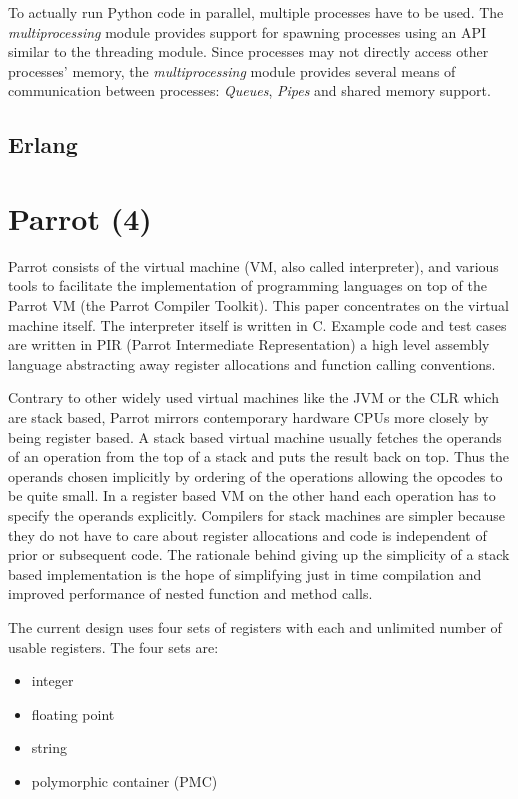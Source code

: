 \documentclass[bachelor,english]{hgbthesis}
\begin{document}
To actually run Python code in parallel, multiple processes have to be used. The \textit{multiprocessing} module provides support for spawning processes using an API similar to the threading module\cite{PythonMultiProcessingManual}. Since processes may not directly access other processes' memory, the \textit{multiprocessing} module provides several means of communication between processes: \textit{Queues}, \textit{Pipes} and shared memory support.

\section{Erlang}

\chapter{Parrot (4)}

Parrot consists of the virtual machine (VM, also called interpreter), and various tools to facilitate the implementation of programming languages on top of the Parrot VM (the Parrot Compiler Toolkit). This paper concentrates on the virtual machine itself. The interpreter itself is written in C. Example code and test cases are written in PIR (Parrot Intermediate Representation) a high level assembly language abstracting away register allocations and function calling conventions.

Contrary to other widely used virtual machines like the JVM or the CLR which are stack based, Parrot mirrors contemporary hardware CPUs more closely by being register based. A stack based virtual machine usually fetches the operands of an operation from the top of a stack and puts the result back on top. Thus the operands chosen implicitly by ordering of the operations allowing the opcodes to be quite small. In a register based VM on the other hand each operation has to specify the operands explicitly. Compilers for stack machines are simpler because they do not have to care about register allocations and code is independent of prior or subsequent code\cite{VMShowdown}. The rationale behind giving up the simplicity of a stack based implementation is the hope of simplifying just in time compilation and improved performance of nested function and method calls.

The current design uses four sets of registers with each and unlimited number of usable registers. The four sets are:
%
\begin{itemize}
\item integer
\item floating point
\item string
\item polymorphic container (PMC)
\end{itemize}
\end{document}
